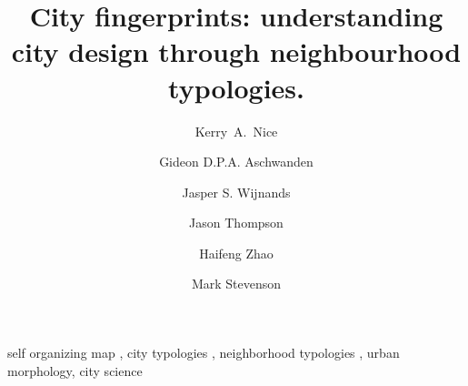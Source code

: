 \documentclass[final,3p,times,authoryear]{elsarticle}
\begin{document}
\begin{frontmatter}



\title{City fingerprints: understanding city design through neighbourhood typologies.}





\author[melb]{Kerry~A.~Nice}
\author[melb]{Gideon D.P.A. Aschwanden}
\author[melb]{Jasper S. Wijnands}
\author[melb]{Jason Thompson}
\author[melb]{Haifeng Zhao}
\author[melb,eng]{Mark Stevenson}

\address[melb]{Transport, Health, and Urban Design Research Hub, Faculty of Architecture, Building, and Planning, University of Melbourne, Australia}
\address[eng]{Melbourne School of Engineering; and Melbourne School of Population and Global Health, University of Melbourne, Australia.}




\begin{abstract}



\end{abstract}

\begin{keyword}
self organizing map \sep 
city typologies \sep 
neighborhood typologies \sep 
urban morphology\sep
city science


\end{keyword}

\end{frontmatter}
\end{document}

